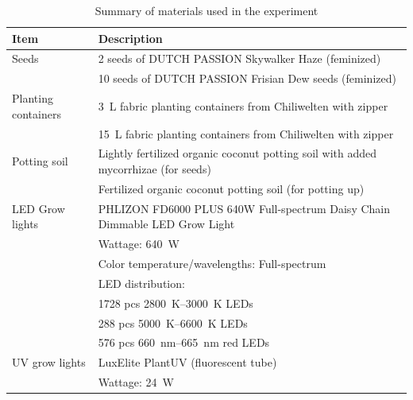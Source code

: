 \begin{table}[htbp]
    \caption{Summary of materials used in the experiment}
    \label{tab:materials}
    \begin{tabularx}{\linewidth}{lX}
        \toprule
        Item & Description \\
        \midrule
        Seeds\index{seeds!cannabis} & 2 seeds of DUTCH PASSION Skywalker Haze\index{seeds!cannabis!Skywalker Haze} (feminized) \\
        & 10 seeds of DUTCH PASSION Frisian Dew seeds\index{seeds!cannabis!Frisian Dew} (feminized) \\
        \addlinespace
        Planting containers\index{planting container} & \qty[mode=text]{3}{\L} fabric planting containers from Chiliwelten with zipper \\
        & \qty[mode=text]{15}{\L} fabric planting containers from Chiliwelten with zipper \\
        \addlinespace
        Potting soil\index{potting soil} & Lightly fertilized organic coconut potting soil with added mycorrhizae\index{mycorrhizae} (for seeds) \\
        & Fertilized organic coconut potting soil (for potting up) \\
        \addlinespace
        LED Grow lights\index{grow light!LED} & PHLIZON FD6000 PLUS 640W Full-spectrum Daisy Chain Dimmable LED Grow Light\index{grow light!LED!PHLIZON FD6000 PLUS 640W Full-spectrum} \\
        & \quad Wattage: \qty[mode=text]{640}{\W} \\
        & \quad Color temperature/wavelengths: Full-spectrum \\
        & \quad LED distribution: \\
        & \quad \quad \num[mode=text]{1728} pcs \qtyrange[mode=text, range-phrase=\textendash, range-units=single]{2800}{3000}{\K} LEDs \\
        & \quad \quad \num[mode=text]{288} pcs \qtyrange[mode=text, range-phrase=\textendash, range-units=single]{5000}{6600}{\K} LEDs \\
        & \quad \quad \num[mode=text]{576} pcs \qtyrange[mode=text, range-phrase=\textendash, range-units=single]{660}{665}{\nm} red LEDs \\
        \addlinespace
        UV grow lights\index{grow light!UV} & LuxElite PlantUV (fluorescent tube)\index{grow light!UV!LuxElite PlantUV} \\
        & \quad Wattage: \qty[mode=text]{24}{\W} \\

\end{tabularx}
\end{table}
